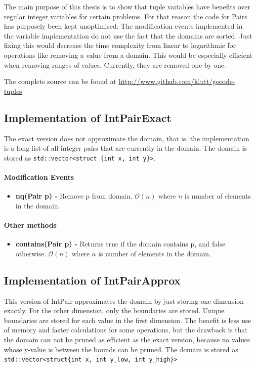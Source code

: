 \documentclass[a4paper,11pt]{article}
\begin{document}
The main purpose of this thesis is to show that tuple variables have benefits over regular integer variables for certain problems. For that reason the code for Pairs has purposely been kept unoptimised. The modification events implemented in the variable implementation do not use the fact that the domains are sorted. Just fixing this would decrease the time complexity from linear to logarithmic for operations like removing a value from a domain. This would be especially efficient when removing ranges of values. Currently, they are removed one by one.

The complete source can be found at \url{http://www.github.com/klutt/gecode-tuples}

\subsection{Implementation of IntPairExact}
The exact version does not approximate the domain, that is, the implementation is a long list of all integer pairs that are currently in the domain. The domain is stored as \texttt{std::vector<struct \{int x, int y\}>}. 

\paragraph{Modification Events}
\begin{itemize}
\item {\textbf{nq(Pair p) - }} Remove p from domain. $\mathcal{O}(n)$ where $n$ is number of elements in the domain.
\end{itemize}

\paragraph{Other methods}
\begin{itemize}
\item {\textbf{contains(Pair p) - }} Returns true if the domain contains p, and false otherwise. $\mathcal{O}(n)$ where $n$ is number of elements in the domain.
\end{itemize}

\subsection{Implementation of IntPairApprox}
\label{sec:impapprox}
This version of IntPair approximates the domain by just storing one dimension exactly. For the other dimension, only the boundaries are stored. Unique boundaries are stored for each value in the first dimension. The benefit is less use of memory and faster calculations for some operations, but the drawback is that the domain can not be pruned as efficient as the exact version, because no values whose y-value is between the bounds can be pruned. The domain is stored as \texttt{std::vector<struct\{int x, int y\_low, int y\_high\}>}
\end{document}
